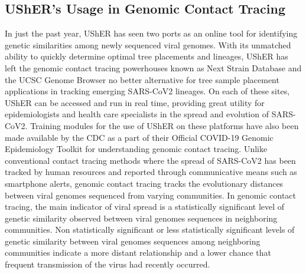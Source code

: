 \documentclass[12pt,journal,compsoc]{IEEEtran}
\begin{document}
 \subsection{UShER's Usage in Genomic Contact Tracing}
In just the past year, UShER has seen two ports as an online tool for identifying genetic similarities among newly sequenced viral genomes. With its unmatched ability to quickly determine optimal tree placements and lineages, UShER has left the genomic contact tracing powerhouses known as Next Strain Database and the UCSC Genome Browser no better alternative for tree sample placement applications in tracking emerging SARS-CoV2 lineages. On each of these sites, UShER can be accessed and run in real time, providing great utility for epidemiologists and health care specialists in the spread and evolution of SARS-CoV2. Training modules for the use of UShER on these platforms have also been made available by the CDC  as a part of their Official COVID-19 Genomic Epidemiology Toolkit for understanding genomic contact tracing. Unlike conventional contact tracing methods where the spread of SARS-CoV2 has been tracked by human resources and reported through communicative means such as smartphone alerts, genomic contact tracing tracks the evolutionary distances between viral genomes sequenced from varying communities. In genomic contact tracing, the main indicator of viral spread is a statistically significant level of genetic similarity observed between viral genomes sequences in neighboring communities. Non statistically significant or less statistically significant levels of genetic similarity between viral genomes sequences among neighboring communities indicate a more distant relationship and a lower chance that frequent transmission of the virus had recently occurred.
 
\end{document}
